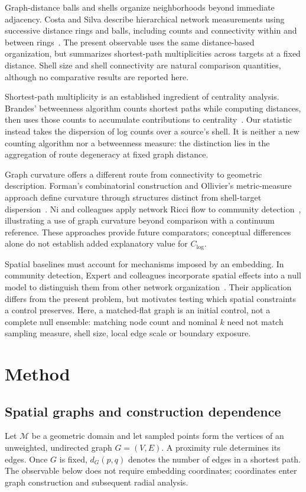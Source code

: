 \documentclass[11pt,a4paper]{article}
\begin{document}
Graph-distance balls and shells organize neighborhoods beyond immediate adjacency. Costa and Silva describe hierarchical network measurements using successive distance rings and balls, including counts and connectivity within and between rings~\cite{CostaSilva2006}. The present observable uses the same distance-based organization, but summarizes shortest-path multiplicities across targets at a fixed distance. Shell size and shell connectivity are natural comparison quantities, although no comparative results are reported here.

Shortest-path multiplicity is an established ingredient of centrality analysis. Brandes' betweenness algorithm counts shortest paths while computing distances, then uses those counts to accumulate contributions to centrality~\cite{Brandes2001}. Our statistic instead takes the dispersion of log counts over a source's shell. It is neither a new counting algorithm nor a betweenness measure: the distinction lies in the aggregation of route degeneracy at fixed graph distance.

Graph curvature offers a different route from connectivity to geometric description. Forman's combinatorial construction and Ollivier's metric-measure approach define curvature through structures distinct from shell-target dispersion~\cite{Forman2003,Ollivier2009}. Ni and colleagues apply network Ricci flow to community detection~\cite{Ni2019}, illustrating a use of graph curvature beyond comparison with a continuum reference. These approaches provide future comparators; conceptual differences alone do not establish added explanatory value for $C_{\log}$.

Spatial baselines must account for mechanisms imposed by an embedding. In community detection, Expert and colleagues incorporate spatial effects into a null model to distinguish them from other network organization~\cite{Expert2011}. Their application differs from the present problem, but motivates testing which spatial constraints a control preserves. Here, a matched-flat graph is an initial control, not a complete null ensemble: matching node count and nominal $k$ need not match sampling measure, shell size, local edge scale or boundary exposure.

\section{Method}
\subsection{Spatial graphs and construction dependence}
Let $\mathcal{M}$ be a geometric domain and let sampled points form the vertices of an unweighted, undirected graph $G=(V,E)$. A proximity rule determines its edges. Once $G$ is fixed, $d_G(p,q)$ denotes the number of edges in a shortest path. The observable below does not require embedding coordinates; coordinates enter graph construction and subsequent radial analysis.
\end{document}
